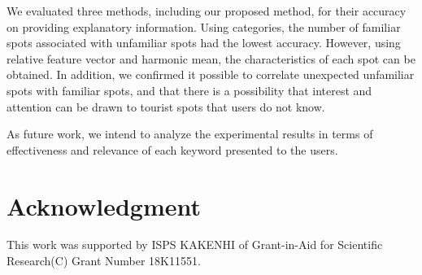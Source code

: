 \documentclass[journal]{IAENGtran}
\begin{document}
We evaluated three methods, including our proposed method, for their accuracy on providing explanatory information.
Using categories, the number of familiar spots associated with unfamiliar spots had the lowest accuracy.
However, using relative feature vector and harmonic mean, the characteristics of each spot can be obtained.
In addition, we confirmed it possible to correlate unexpected unfamiliar spots with familiar spots, and that there is a possibility that interest and attention can be drawn to tourist spots that users do not know.

As future work, we intend to analyze the experimental results in terms of effectiveness and relevance of each keyword presented to the users.

\section*{Acknowledgment}
This work was supported by ISPS KAKENHI of Grant-in-Aid for Scientific Research(C) Grant Number 18K11551.

\ifCLASSOPTIONcaptionsoff
  \newpage
\fi
\end{document}
